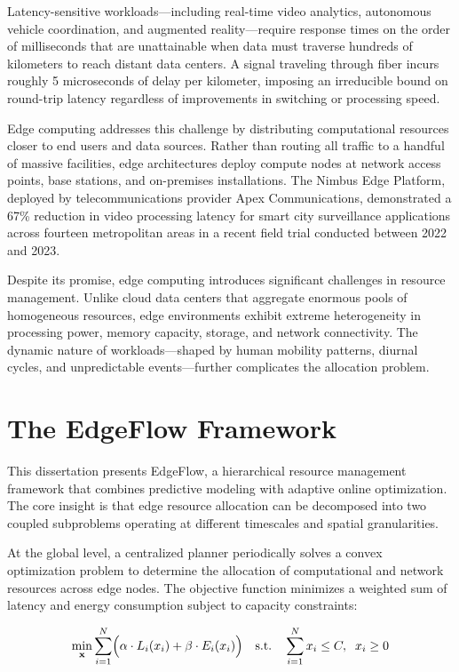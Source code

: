 \documentclass[12pt,oneside]{report}
\begin{document}
Latency-sensitive workloads---including real-time video analytics, autonomous vehicle coordination, and augmented reality---require response times on the order of milliseconds that are unattainable when data must traverse hundreds of kilometers to reach distant data centers. A signal traveling through fiber incurs roughly 5 microseconds of delay per kilometer, imposing an irreducible bound on round-trip latency regardless of improvements in switching or processing speed.

Edge computing addresses this challenge by distributing computational resources closer to end users and data sources. Rather than routing all traffic to a handful of massive facilities, edge architectures deploy compute nodes at network access points, base stations, and on-premises installations. The Nimbus Edge Platform, deployed by telecommunications provider Apex Communications, demonstrated a 67\% reduction in video processing latency for smart city surveillance applications across fourteen metropolitan areas in a recent field trial conducted between 2022 and 2023.

Despite its promise, edge computing introduces significant challenges in resource management. Unlike cloud data centers that aggregate enormous pools of homogeneous resources, edge environments exhibit extreme heterogeneity in processing power, memory capacity, storage, and network connectivity. The dynamic nature of workloads---shaped by human mobility patterns, diurnal cycles, and unpredictable events---further complicates the allocation problem.

\section{The EdgeFlow Framework}

This dissertation presents EdgeFlow, a hierarchical resource management framework that combines predictive modeling with adaptive online optimization. The core insight is that edge resource allocation can be decomposed into two coupled subproblems operating at different timescales and spatial granularities.

At the global level, a centralized planner periodically solves a convex optimization problem to determine the allocation of computational and network resources across edge nodes. The objective function minimizes a weighted sum of latency and energy consumption subject to capacity constraints:

\begin{equation}
\min_{\mathbf{x}} \sum_{i=1}^{N} \Bigl( \alpha \cdot L_i(x_i) + \beta \cdot E_i(x_i) \Bigr) \quad \text{s.t.} \quad \sum_{i=1}^{N} x_i \leq C,\;\; x_i \geq 0
\label{eq:global_opt}
\end{equation}
\end{document}
